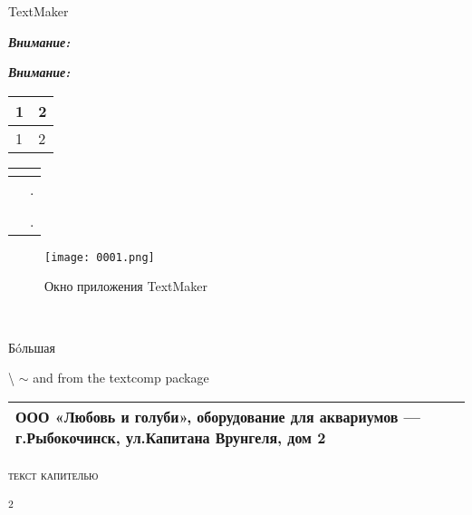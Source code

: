 
TextMaker

\begin{mdframed}[backgroundcolor=pink!50]
\textbf{\textit{Внимание:}} 
\end{mdframed}

\begin{mdframed}[backgroundcolor=blue!10]
\textbf{\textit{Внимание:}} 
\end{mdframed}


\begin{center}
\begin{tabular}{ | m{4cm} | m{10cm} | }
\hline
 1 & 2 \\ 
 \hline
 1 & 2\\
\hline
\end{tabular}
\end{center}

\begin{center}
\begin{tabular}{  m{4cm}  m{12cm}  }
 \textbf{} & \textbf{} \\ 
 \hline
  \textbf{} & .\\
  \textbf{} & \\ 
\textbf{} & .\\
\end{tabular}
\end{center}

\begin{myindentpar}{2cm}
 
\end{myindentpar}


\begin{figure}[ht]
\texttt{[image: 0001.png]}
\centering
\caption{Окно приложения TextMaker}
\end{figure}

 
 

Б\'{o}льшая 

\textbackslash
$\sim$ and \texttildelow from the textcomp package  %

\begin{center}
\begin{tabular}{ | m{15cm} | }
\hline
ООО «Любовь и голуби»,  оборудование для аквариумов — г.Рыбокочинск, ул.Капитана Врунгеля, дом 2\\
\hline
\end{tabular}
\end{center}


\textsc{текст капителью}

\textsuperscript{2}


